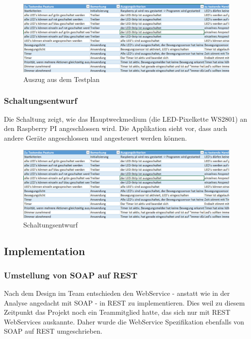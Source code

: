 \documentclass[]{article}
\begin{document}
\begin{figure}[H]
\centering
\includegraphics{./WI25_Erstellen_Testplan_Auszug.jpeg}
\caption{Auszug aus dem Testplan}
\end{figure}

\subsubsection{Schaltungsentwurf}\label{schaltungsentwurf}

Die Schaltung zeigt, wie das Hauptweckmedium (die LED-Pixelkette WS2801)
an den Raspberry PI angeschlossen wird. Die Applikation sieht vor, dass
auch andere Geräte angeschlossen und angesteuert werden können.

\begin{figure}[H]
\centering
\includegraphics{./WI25_Erstellen_Testplan_Auszug.jpeg}
\caption{Schaltungsentwurf}
\end{figure}

\subsection{Implementation}\label{implementation}

\subsubsection{Umstellung von SOAP auf
REST}\label{umstellung-von-soap-auf-rest}

Nach dem Design im Team entschieden den WebService - anstatt wie in der
Analyse angedacht mit SOAP - in REST zu implementieren. Dies weil zu
diesem Zeitpunkt das Projekt noch ein Teammitglied hatte, das sich nur
mit REST WebServices auskannte. Daher wurde die WebService Spezifikation
ebenfalls von SOAP auf REST umgeschrieben.
\end{document}
